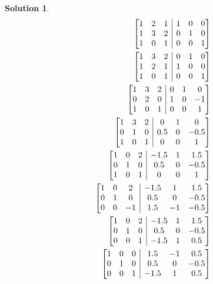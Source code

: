 \documentclass{article}
\newtheorem*{solution}{Solution}
\begin{document}
\begin{solution}
\begin{align*}
\left[ \begin{array}{@{}ccc|ccc@{}}
1 & 2 & 1 & 1 & 0 & 0 \\ 1 & 3 & 2 & 0 & 1 & 0 \\ 1 & 0 & 1 & 0 & 0 & 1
\end{array} \right] \\
\left[ \begin{array}{@{}ccc|ccc@{}}
1 & 3 & 2 & 0 & 1 & 0 \\ 1 & 2 & 1 & 1 & 0 & 0 \\ 1 & 0 & 1 & 0 & 0 & 1
\end{array} \right] \\
\left[ \begin{array}{@{}ccc|ccc@{}}
1 & 3 & 2 & 0 & 1 & 0 \\ 0 & 2 & 0 & 1 & 0 & -1 \\ 1 & 0 & 1 & 0 & 0 & 1
\end{array} \right] \\
\left[ \begin{array}{@{}ccc|ccc@{}}
1 & 3 & 2 & 0 & 1 & 0 \\ 0 & 1 & 0 & 0.5 & 0 & -0.5 \\ 1 & 0 & 1 & 0 & 0 & 1
\end{array} \right] \\
\left[ \begin{array}{@{}ccc|ccc@{}}
1 & 0 & 2 & -1.5 & 1 & 1.5 \\ 0 & 1 & 0 & 0.5 & 0 & -0.5 \\ 1 & 0 & 1 & 0 & 0 & 1
\end{array} \right] \\
\left[ \begin{array}{@{}ccc|ccc@{}}
1 & 0 & 2 & -1.5 & 1 & 1.5 \\ 0 & 1 & 0 & 0.5 & 0 & -0.5 \\ 0 & 0 & -1 & 1.5 & -1 & -0.5
\end{array} \right] \\
\left[ \begin{array}{@{}ccc|ccc@{}}
1 & 0 & 2 & -1.5 & 1 & 1.5 \\ 0 & 1 & 0 & 0.5 & 0 & -0.5 \\ 0 & 0 & 1 & -1.5 & 1 & 0.5
\end{array} \right] \\
\left[ \begin{array}{@{}ccc|ccc@{}}
1 & 0 & 0 & 1.5 & -1 & 0.5 \\ 0 & 1 & 0 & 0.5 & 0 & -0.5 \\ 0 & 0 & 1 & -1.5 & 1 & 0.5
\end{array} \right] \\
\end{align*}


\end{solution}
\end{document}
